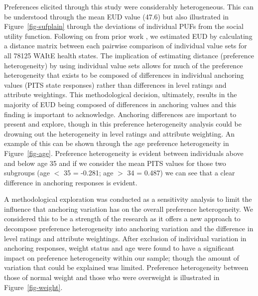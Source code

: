 \documentclass[
  number,
  preprint]{elsarticle}
\begin{document}
Preferences elicited through this study were considerably heterogeneous.
This can be understood through the mean EUD value (47.6) but also
illustrated in Figure~\ref{fig-sufplain} through the deviations of
individual PUFs from the social utility function. Following on from
prior work \citep{Schneider2024ExploringLevel}, we estimated EUD by
calculating a distance matrix between each pairwise comparison of
individual value sets for all 78125 WAItE health states. The implication
of estimating distance (preference heterogeneity) by using individual
value sets allows for much of the preference heterogeneity that exists
to be composed of differences in individual anchoring values (PITS state
responses) rather than differences in level ratings and attribute
weightings. This methodological decision, ultimately, results in the
majority of EUD being composed of differences in anchoring values and
this finding is important to acknowledge. Anchoring differences are
important to present and explore, though in this preference
heterogeneity analysis could be drowning out the heterogeneity in level
ratings and attribute weighting. An example of this can be shown through
the age preference heterogeneity in Figure~\ref{fig-age}. Preference
heterogeneity is evident between individuals above and below age 35 and
if we consider the mean PITS values for those two subgroups (age \(<\)
35 = -0.281; age \(>\) 34 = 0.487) we can see that a clear difference in
anchoring responses is evident.

A methodological exploration was conducted as a sensitivity analysis to
limit the influence that anchoring variation has on the overall
preference heterogeneity. We considered this to be a strength of the
research as it offers a new approach to decompose preference
heterogeneity into anchoring variation and the difference in level
ratings and attribute weightings. After exclusion of individual
variation in anchoring responses, weight status and age were found to
have a significant impact on preference heterogeneity within our sample;
though the amount of variation that could be explained was limited.
Preference heterogeneity between those of normal weight and those who
were overweight is illustrated in Figure~\ref{fig-weight}.
\end{document}
